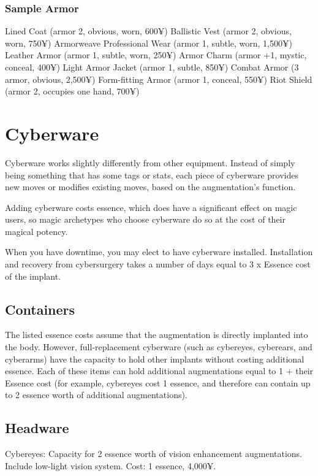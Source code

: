 \subsubsection{Sample Armor}
Lined Coat (armor 2, obvious, worn, 600¥)
Ballistic Vest (armor 2, obvious, worn, 750¥)
Armorweave Professional Wear (armor 1, subtle, worn, 1,500¥)
Leather Armor (armor 1, subtle, worn, 250¥)
Armor Charm (armor +1, mystic, conceal, 400¥)
Light Armor Jacket (armor 1, subtle, 850¥)
Combat Armor (3 armor, obvious, 2,500¥)
Form-fitting Armor (armor 1, conceal, 550¥)
Riot Shield (armor 2, occupies one hand, 700¥)


\section{Cyberware}

Cyberware works slightly differently from other equipment. Instead of simply being something that has some tags or stats, each piece of cyberware provides new moves or modifies existing moves, based on the augmentation’s function.

Adding cyberware costs essence, which does have a significant effect on magic users, so magic archetypes who choose cyberware do so at the cost of their magical potency.

When you have downtime, you may elect to have cyberware installed. Installation and recovery from cybersurgery takes a number of days equal to 3 x Essence cost of the implant.

\subsection{Containers}
The listed essence costs assume that the augmentation is directly implanted into the body. However, full-replacement cyberware (such as cybereyes, cyberears, and cyberarms) have the capacity to hold other implants without costing additional essence. Each of these items can hold additional augmentations equal to 1 + their Essence cost (for example, cybereyes cost 1 essence, and therefore can contain up to 2 essence worth of additional augmentations).

\subsection{Headware}
Cybereyes: Capacity for 2 essence worth of vision enhancement augmentations. Include low-light vision system. Cost: 1 essence, 4,000¥.

